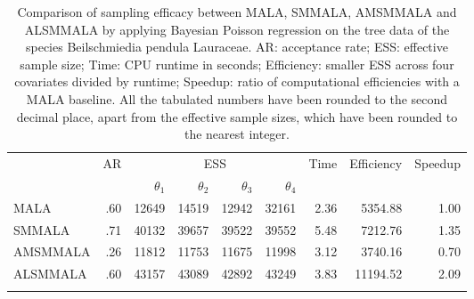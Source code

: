 \documentclass[twoside,11pt]{article}
\begin{document}
\begin{table}
  \centering
	\begin{tabular}{l|r|rrrr|r|r|r}
		\hline\noalign{\smallskip}
		\multirow{2}{*}{Method} &
		\multirow{2}{*}{AR} &
		\multicolumn{4}{c|}{ESS} &
		\multirow{2}{*}{Time} &
		\multirow{2}{*}{Efficiency} &
		\multirow{2}{*}{Speedup} \\
		& & $\theta_1$ & $\theta_2$ & $\theta_3$ & $\theta_4$ & & & \\
		\noalign{\smallskip}\hline\noalign{\smallskip}
		MALA & .60 & 12649 & 14519 & 12942 & 32161 & 2.36 & 5354.88 & 1.00 \\
		SMMALA & .71 & 40132 & 39657 & 39522 & 39552 & 5.48 & 7212.76 & 1.35 \\
		AMSMMALA & .26 & 11812 & 11753 & 11675 & 11998 & 3.12 & 3740.16 & 0.70 \\
		ALSMMALA & .60 & 43157 & 43089 & 42892 & 43249 & 3.83 & 11194.52 & 2.09 \\
		\noalign{\smallskip}\hline
	\end{tabular}
	\caption{Comparison of sampling efficacy between MALA, SMMALA, AMSMMALA and ALSMMALA by applying Bayesian Poisson 
		regression on the tree data of the species Beilschmiedia pendula Lauraceae. AR: acceptance rate; ESS: effective sample 
		size; Time: CPU runtime in seconds; Efficiency: smaller ESS across four covariates divided by runtime; Speedup: ratio of 
		computational efficiencies with a MALA baseline. All the tabulated numbers have been rounded to the second decimal 
		place, apart from the effective sample sizes, which have been rounded to the nearest integer.}
	\label{tab:poisson}
\end{table}
\end{document}
